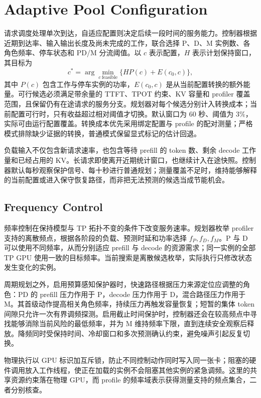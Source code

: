 \section{Adaptive Pool Configuration}
请求调度处理单次到达，自适应配置则决定后续一段时间的服务能力。控制器根据近期到达率、输入输出长度及尚未完成的工作，联合选择 P、D、M 实例数、各角色频率、停车状态和 PD/M 分流阈值。以 $c$ 表示配置，$H$ 表示计划保持窗口，其目标为
\begin{equation}
 c^*=\arg\min_{c\ \mathrm{feasible}}
       \{H P(c)+E(c_0,c)\},
 \label{eq:pool-objective}
\end{equation}
其中 $P(c)$ 包含工作与停车实例的功率，$E(c_0,c)$ 是从当前配置转换的额外能量。可行候选必须满足带余量的 TTFT、TPOT 约束、KV 容量和 profiler 覆盖范围，且保留仍有在途请求的服务分支。规划器对每个候选分别计入转换成本；当前配置可行时，只有收益超过相对阈值才切换。默认窗口为 $60$ 秒、阈值为 $3\%$，实际可由运行配置覆盖。转换成本优先采用绑定配置与 profile 的配对测量；严格模式排除缺少证据的转换，普通模式保留显式标记的估计回退。

负载输入不仅包含新请求速率，也包含等待 prefill 的 token 数、剩余 decode 工作量和已经占用的 KV。长请求即使离开近期统计窗口，也继续计入在途快照。控制器默认每秒观察保护信号、每十秒进行普通规划；测量覆盖不足时，维持能够解释的当前配置或进入保守恢复路径，而非把无法预测的候选当成节能机会。

\subsection{Frequency Control}
频率控制在保持模型与 TP 拓扑不变的条件下改变服务速率。规划器枚举 profiler 支持的离散频点，根据各阶段的负载、预测时延和功率选择 $f_P,f_D,f_M$。P 与 D 可以使用不同频率，从而分别适应 prefill 与 decode 的资源需求；同一实例的全部 TP GPU 使用一致的目标频率。当前搜索是离散候选枚举，实际执行只修改状态发生变化的实例。

周期规划之外，启用预算感知保护器时，快速路径根据压力来源定位应调整的角色：PD 的 prefill 压力作用于 P，decode 压力作用于 D，混合路径压力作用于 M。其首级动作提高相关角色频率，持续压力再触发容量恢复；短暂的集体 token 间隙只允许一次有界调频探测。启用截止时间保护时，控制器还会在较高频点中寻找能够消除当前风险的最低频率，并为 M 维持频率下限，直到连续安全观察后释放。降频同时受保持时间、冷却窗口和多次预测确认约束，避免噪声引起反复切换。

物理执行以 GPU 标识加互斥锁，防止不同控制动作同时写入同一张卡；阻塞的硬件调用放入工作线程，使正在加载的实例不会阻塞其他实例的紧急调频。这里的共享资源约束落在物理 GPU，而 profile 的频率域表示获得测量支持的频点集合，二者分别核查。

